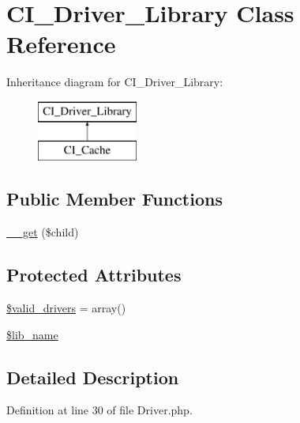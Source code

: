 \hypertarget{class_c_i___driver___library}{\section{C\-I\-\_\-\-Driver\-\_\-\-Library Class Reference}
\label{class_c_i___driver___library}
}
Inheritance diagram for C\-I\-\_\-\-Driver\-\_\-\-Library\-:\begin{figure}[H]
\begin{center}
\leavevmode
\includegraphics[height=2.000000cm]{class_c_i___driver___library}
\end{center}
\end{figure}
\subsection*{Public Member Functions}
\begin{DoxyCompactItemize}
\item 
\hyperlink{class_c_i___driver___library_a2fac4d4694e05e7eeba5282bd6ff8caf}{\-\_\-\-\_\-get} (\$child)
\end{DoxyCompactItemize}
\subsection*{Protected Attributes}
\begin{DoxyCompactItemize}
\item 
\hyperlink{class_c_i___driver___library_a32d963b3d49fd67f188c1a74d38be6df}{\$valid\-\_\-drivers} = array()
\item 
\hyperlink{class_c_i___driver___library_ab820c27413d5904686c58f6b2941b603}{\$lib\-\_\-name}
\end{DoxyCompactItemize}


\subsection{Detailed Description}


Definition at line 30 of file Driver.\-php.



